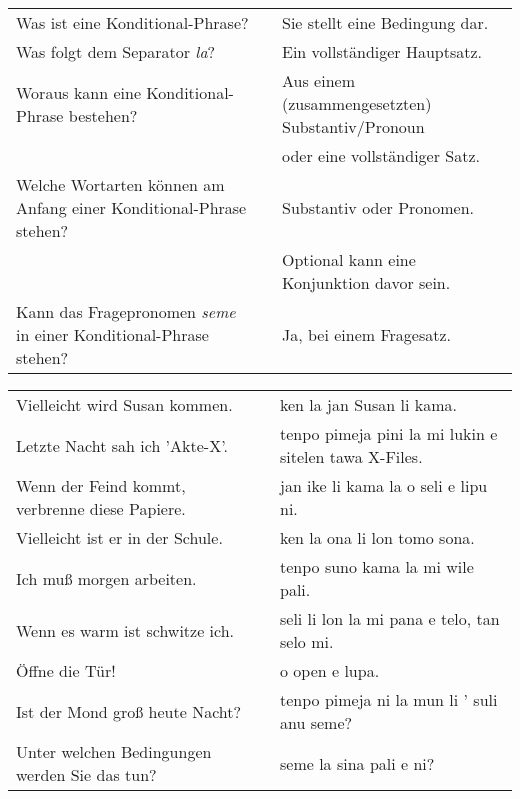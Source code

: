 \begin{supertabular}{p{5,5cm}|ll}
Was ist eine Konditional-Phrase? && Sie stellt eine Bedingung dar. \\  %
Was folgt dem Separator \textit{la}? && Ein vollständiger Hauptsatz. \\  %
Woraus kann eine Konditional-Phrase bestehen? && Aus einem (zusammengesetzten) Substantiv/Pronoun \\ && oder eine vollständiger Satz. \\  %
Welche Wortarten können am Anfang einer Konditional-Phrase stehen? && Substantiv oder Pronomen. \\ &&  Optional kann eine Konjunktion davor sein. \\  %
Kann das Fragepronomen \textit{seme} in einer Konditional-Phrase stehen? && Ja, bei einem Fragesatz. \\  %
\end{supertabular}







\begin{supertabular}{p{5,5cm}|ll}
Vielleicht wird Susan kommen.  && ken la jan Susan li kama. \\ %
Letzte Nacht sah ich 'Akte-X'.  && tenpo pimeja pini la mi lukin e sitelen tawa X-Files. \\ %
Wenn der Feind kommt, verbrenne diese Papiere.  && jan ike li kama la o seli e lipu ni. \\ %
Vielleicht ist er in der Schule.  && ken la ona li lon tomo sona. \\ %
Ich muß morgen arbeiten.  && tenpo suno kama la mi wile pali. \\ %
Wenn es warm ist schwitze ich.  && seli li lon la mi pana e telo, tan selo mi. \\ %
Öffne die Tür!  && o open e lupa. \\ %
Ist der Mond groß heute Nacht?  && tenpo pimeja ni la mun li ' suli anu seme? \\ %
Unter welchen Bedingungen werden Sie das tun? && seme la sina pali e ni?  \\ %
\end{supertabular}  

